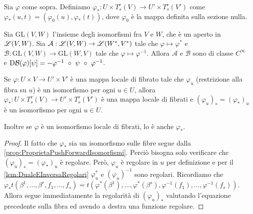 \begin{definition} 
	Sia $\varphi$ come sopra. Definiamo $\varphi_*: U \times T_s^r(V) \to U'\times T_s^r(V')$ come $\varphi_*(u,t) = (\varphi_0(u), \varphi_*(t))$, dove $\varphi_0$ è la mappa definita sulla sezione nulla.
\end{definition}

\begin{lemma} \label{lem:DualeEInversaRegolari}
	Sia $\mathrm {GL} (V,W)$ l'insieme degli isomorfismi fra $V$ e $W$, che è un aperto in $\mathscr L(V,W)$. Sia $\mathcal A:\mathscr L(V,W)\to \mathscr L(W^*,V^*)$ tale che $\varphi\mapsto \varphi^*$ e $\mathcal B: \mathrm {GL} (V,W) \to \mathrm {GL} (W,V)$ tale che $\varphi \mapsto \varphi^{-1}$. %
	Allora $\mathcal A$ e $\mathcal B$ sono di classe $C^\infty$ e $\mathrm D \mathcal B(\varphi)[\psi] = -\varphi^{-1}\ \circ\ \psi\ \circ\ \varphi^{-1}$.
\end{lemma}

\begin{proposition}
	Se $\varphi:U\times V\to U'\times V'$ è una mappa locale di fibrato tale che $\varphi_u$ (restrizione alla fibra su $u$) è un isomorfismo per ogni $u\in U$, allora $\varphi_*: U\times T_s^r(V)\to U'\times T_s^r(V')$ è una mappa locale di fibrati e $(\varphi_u)_* = (\varphi_*)_u$ è un isomorfismo per ogni $u\in U$.
	
	Inoltre se $\varphi$ è un isomorfismo locale di fibrati, lo è anche $\varphi_*$.
\end{proposition}

\begin{proof}
	Il fatto che $\varphi_*$ sia un isomorfismo sulle fibre segue dalla \cref{prop:ProprietaPushForwardIsomorfismi}.
	Perciò bisogna solo verificare che $(\varphi_u)_*=(\varphi_*)_u$ è regolare. Però, $\varphi_u$ è regolare in $u$ per definizione e per il \cref{lem:DualeEInversaRegolari} $\varphi_u^*$ e $(\varphi_u)^{-1}$ sono regolari.
	Ricordiamo che $\varphi_*t(\beta^1,\ldots,\beta^r,f_1,\ldots,f_s) = t(\varphi^*(\beta^1),\ldots,\varphi^*(\beta^s),\varphi^{-1}(f_1),\ldots,\varphi^{-1}(f_s))$. Allora
	segue immediatamente la regolarità di $(\varphi_u)_*$ valutando l'equazione precedente sulla fibra ed avendo a destra una funzione regolare.
\end{proof}


